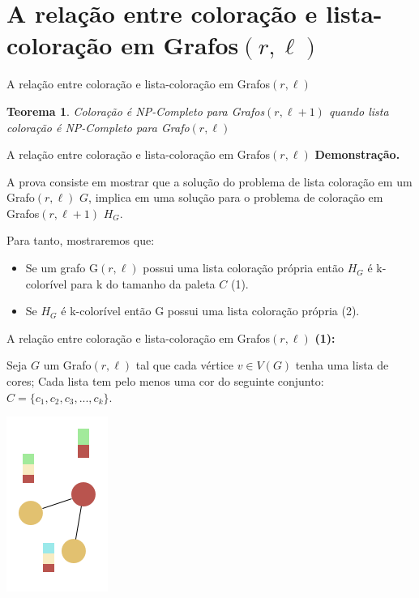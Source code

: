 \documentclass[9pt, compress]{beamer}
\newtheorem{teorema}{Teorema}
\begin{document}
    \section{A relação entre coloração e lista-coloração em Grafos$(r,\ell)$}
    \begin{frame}{A relação entre coloração e lista-coloração em Grafos$(r,\ell)$}
        \begin{teorema}
          Coloração é NP-Completo para Grafos$(r,\ell+1)$ quando lista coloração é NP-Completo para Grafo$(r,\ell)$
        \end{teorema}
    \end{frame}
    \begin{frame}{A relação entre coloração e lista-coloração em Grafos$(r,\ell)$}
        \textbf{Demonstração.}
        
        A prova consiste em mostrar que a solução do problema de lista coloração em um Grafo$(r,\ell)$ $G$, implica em uma solução para o problema de coloração em Grafos$(r,\ell+1)$ $H_G$.
        
        Para tanto, mostraremos que:
          \begin{itemize}
        \item Se um grafo G$(r,\ell)$ possui uma lista coloração própria então $H_G$ é k-colorível para k do tamanho da paleta $C$ (1).
		\item Se $H_G$ é k-colorível então G possui uma lista coloração própria (2).
      \end{itemize}
    \end{frame}
    \begin{frame}{A relação entre coloração e lista-coloração em Grafos$(r,\ell)$}
      \textbf{(1):}
      
      Seja $G$ um Grafo$(r,\ell)$ tal que cada vértice $v \in V(G)$ tenha uma lista de cores; 
      Cada lista tem pelo menos uma cor do seguinte conjunto: $C = \{c_1,c_2,c_3,...,c_k \}$. 
      \begin{center}
        \includegraphics[scale=0.4]{presentation-G.png}
      \end{center}
    \end{frame}
\end{document}
